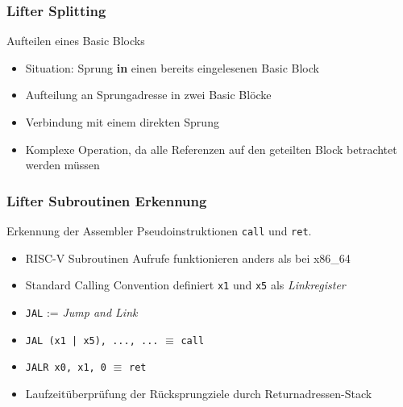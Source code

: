 \begin{frame}
    \frametitle{Lifter Splitting}{Aufteilen eines Basic Blocks}
    \begin{itemize}
        \setlength{\itemsep}{1em}
        \item Situation: Sprung \textbf{in} einen bereits eingelesenen Basic Block
        \item Aufteilung an Sprungadresse in zwei Basic Blöcke
        \item Verbindung mit einem direkten Sprung
        \item Komplexe Operation, da alle Referenzen auf den geteilten Block betrachtet werden müssen
    \end{itemize}
\end{frame}
\clearpage

\begin{frame}
    \frametitle{Lifter Subroutinen Erkennung}{Erkennung der Assembler Pseudoinstruktionen \texttt{call} und \texttt{ret}.}
    \begin{itemize}
        \setlength{\itemsep}{1em}
        \item RISC-V Subroutinen Aufrufe funktionieren anders als bei x86\_64
        \item Standard Calling Convention definiert \texttt{x1} und \texttt{x5} als \textit{Linkregister}
        \item \texttt{JAL} := \textit{Jump and Link}
        \item \texttt{JAL (x1 | x5), ..., ...} $\equiv$ \texttt{call}
        \item \texttt{JALR x0, x1, 0} $\equiv$ \texttt{ret}
        \item Laufzeitüberprüfung der Rücksprungziele durch Returnadressen-Stack
    \end{itemize}
\end{frame}
\clearpage

